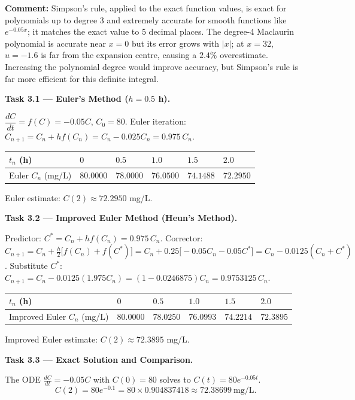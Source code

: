 \documentclass[11pt]{article}
\begin{document}
\textbf{Comment:} Simpson's rule, applied to the exact function values, is exact for polynomials up to degree 3 and extremely accurate for smooth functions like $e^{-0.05x}$; it matches the exact value to 5 decimal places. The degree-4 Maclaurin polynomial is accurate near $x=0$ but its error grows with $|x|$; at $x=32$, $u=-1.6$ is far from the expansion centre, causing a $2.4\%$ overestimate. Increasing the polynomial degree would improve accuracy, but Simpson's rule is far more efficient for this definite integral.

\vspace{0.5em}
\textbf{Task 3.1 — Euler's Method ($h=0.5$ h).}\par
$\dfrac{dC}{dt} = f(C) = -0.05 C$, $C_0 = 80$.
Euler iteration: $C_{n+1} = C_n + h f(C_n) = C_n - 0.025 C_n = 0.975\,C_n$.

\begin{center}
\begin{tabularx}{\linewidth}{|l|X|X|X|X|X|}
\hline
\rowcolor{popblueL} $t_n$ (h) & $0$ & $0.5$ & $1.0$ & $1.5$ & $2.0$ \\
\hline
Euler $C_n$ (mg/L) & $80.0000$ & $78.0000$ & $76.0500$ & $74.1488$ & $72.2950$ \\
\hline
\end{tabularx}
\end{center}
Euler estimate: $C(2) \approx 72.2950$ mg/L.

\textbf{Task 3.2 — Improved Euler Method (Heun's Method).}\par
Predictor: $C^{*} = C_n + h f(C_n) = 0.975\,C_n$.
Corrector: $C_{n+1} = C_n + \frac{h}{2}\bigl[ f(C_n) + f(C^{*}) \bigr] = C_n + 0.25\bigl[ -0.05 C_n - 0.05 C^{*} \bigr] = C_n - 0.0125(C_n + C^{*})$.
Substitute $C^{*}$: $C_{n+1} = C_n - 0.0125(1.975 C_n) = (1 - 0.0246875)C_n = 0.9753125\,C_n$.

\begin{center}
\begin{tabularx}{\linewidth}{|l|X|X|X|X|X|}
\hline
\rowcolor{popblueL} $t_n$ (h) & $0$ & $0.5$ & $1.0$ & $1.5$ & $2.0$ \\
\hline
Improved Euler $C_n$ (mg/L) & $80.0000$ & $78.0250$ & $76.0993$ & $74.2214$ & $72.3895$ \\
\hline
\end{tabularx}
\end{center}
Improved Euler estimate: $C(2) \approx 72.3895$ mg/L.

\textbf{Task 3.3 — Exact Solution and Comparison.}\par
The ODE $\frac{dC}{dt} = -0.05 C$ with $C(0)=80$ solves to $C(t) = 80 e^{-0.05t}$.
\[ C(2) = 80 e^{-0.1} = 80 \times 0.904837418 \approx 72.38699\ \text{mg/L}. \]
\end{document}
